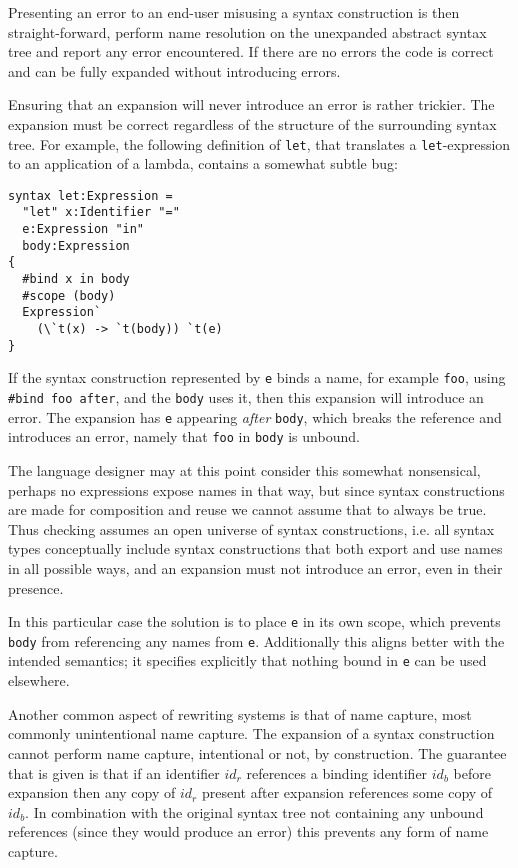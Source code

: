 \documentclass{kththesis}
\begin{document}
Presenting an error to an end-user misusing a syntax construction is then straight-forward, perform name resolution on the unexpanded abstract syntax tree and report any error encountered. If there are no errors the code is correct and can be fully expanded without introducing errors.

Ensuring that an expansion will never introduce an error is rather trickier. The expansion must be correct regardless of the structure of the surrounding syntax tree. For example, the following definition of \texttt{let}, that translates a \texttt{let}-expression to an application of a lambda, contains a somewhat subtle bug:

\begin{verbatim}
syntax let:Expression =
  "let" x:Identifier "="
  e:Expression "in"
  body:Expression
{
  #bind x in body
  #scope (body)
  Expression`
    (\`t(x) -> `t(body)) `t(e)
}
\end{verbatim}

If the syntax construction represented by \texttt{e} binds a name, for example \texttt{foo}, using \texttt{#bind foo after}, and the \texttt{body} uses it, then this expansion will introduce an error. The expansion has \texttt{e} appearing \emph{after} \texttt{body}, which breaks the reference and introduces an error, namely that \texttt{foo} in \texttt{body} is unbound.

The language designer may at this point consider this somewhat nonsensical, perhaps no expressions expose names in that way, but since syntax constructions are made for composition and reuse we cannot assume that to always be true. Thus checking assumes an open universe of syntax constructions, i.e. all syntax types conceptually include syntax constructions that both export and use names in all possible ways, and an expansion must not introduce an error, even in their presence.

In this particular case the solution is to place \texttt{e} in its own scope, which prevents \texttt{body} from referencing any names from \texttt{e}. Additionally this aligns better with the intended semantics; it specifies explicitly that nothing bound in \texttt{e} can be used elsewhere.

Another common aspect of rewriting systems is that of name capture, most commonly unintentional name capture. The expansion of a syntax construction cannot perform name capture, intentional or not, by construction. The guarantee that is given is that if an identifier $id_r$ references a binding identifier $id_b$ before expansion then any copy of $id_r$ present after expansion references some copy of $id_b$. In combination with the original syntax tree not containing any unbound references (since they would produce an error) this prevents any form of name capture.
\end{document}

